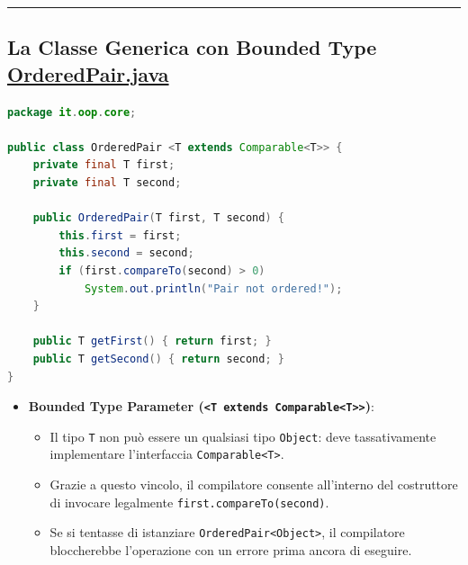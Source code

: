 \documentclass[11pt,a4paper,oneside]{report}
\newcommand{\passthrough}[1]{#1}
\providecommand{\tightlist}{\setlength{\itemsep}{0pt}\setlength{\parskip}{0pt}}
\begin{document}
\begin{center}\rule{0.5\linewidth}{0.5pt}\end{center}

\subsection{\texorpdfstring{La Classe Generica con Bounded Type
\href{file:///home/wally/Documenti/GitHub/Programmazione-II/25-26/Teoria-e-Esercitazioni/Codice-20260902/Lezione14/MavenDate/src/main/java/it/oop/core/OrderedPair.java}{OrderedPair.java}}{La Classe Generica con Bounded Type OrderedPair.java}}\label{chap13_la-classe-generica-con-bounded-type-orderedpair.java}

\begin{lstlisting}[language=Java]
package it.oop.core;

public class OrderedPair <T extends Comparable<T>> {
    private final T first;
    private final T second;

    public OrderedPair(T first, T second) {
        this.first = first;
        this.second = second;
        if (first.compareTo(second) > 0)
            System.out.println("Pair not ordered!");
    }

    public T getFirst() { return first; }
    public T getSecond() { return second; }
}
\end{lstlisting}

\begin{itemize}
\tightlist
\item
  \textbf{Bounded Type Parameter
  (\passthrough{\lstinline!<T extends Comparable<T>>!})}:

  \begin{itemize}
  \tightlist
  \item
    Il tipo \passthrough{\lstinline!T!} non può essere un qualsiasi tipo
    \passthrough{\lstinline!Object!}: deve tassativamente implementare
    l'interfaccia \passthrough{\lstinline!Comparable<T>!}.
  \item
    Grazie a questo vincolo, il compilatore consente all'interno del
    costruttore di invocare legalmente
    \passthrough{\lstinline!first.compareTo(second)!}.
  \item
    Se si tentasse di istanziare
    \passthrough{\lstinline!OrderedPair<Object>!}, il compilatore
    bloccherebbe l'operazione con un errore prima ancora di eseguire.
  \end{itemize}
\end{itemize}
\end{document}
